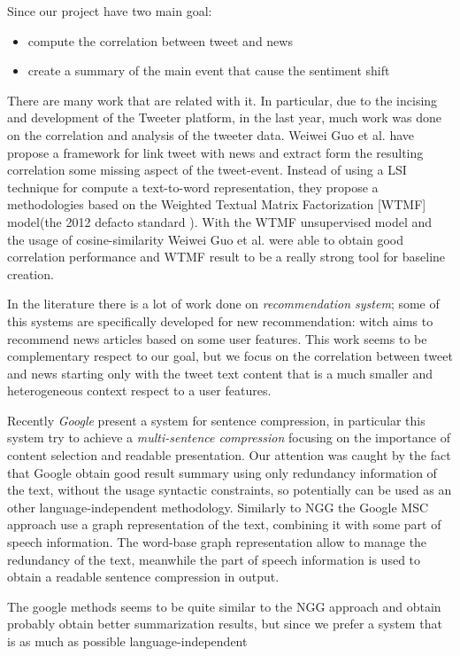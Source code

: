 Since our project have two main goal:
\begin{itemize}
	\item compute the correlation between tweet and news
	\item create a summary of the main event that cause the sentiment shift
\end{itemize}
There are many work that are related with it. 
In particular, due to the incising and development of the Tweeter platform, in the last year, much work was done on the correlation and analysis of the tweeter data. Weiwei Guo et al.\cite{LTN} have propose a framework for link tweet with news and extract form the resulting correlation some missing aspect of the tweet-event. Instead of using a LSI technique for compute a text-to-word representation, they propose a methodologies based on the Weighted Textual Matrix Factorization\cite{WTMF} [WTMF] model(the 2012 defacto standard ). With the WTMF unsupervised model and the usage of cosine-similarity Weiwei Guo et al. were able to obtain good correlation performance and WTMF result to be a really strong tool for baseline creation.

In the literature there is a lot of work done on \emph{recommendation system}; some of this systems are specifically developed for new recommendation: witch aims to recommend news articles based on some user features. This work seems to be complementary respect to our goal, but we focus on the correlation between tweet and news starting only with the tweet text content that is a much smaller and heterogeneous context respect to a user features. 

Recently \emph{Google} present a system for sentence compression, in particular this system try to achieve a \emph{multi-sentence compression}\cite{MSC} focusing on the importance of content selection and readable presentation.
Our attention was caught by the fact that Google obtain good result summary using only redundancy information of the text, without the usage syntactic constraints, so potentially can be used as an other language-independent methodology. Similarly to NGG the Google MSC approach use a graph representation of the text, combining it with some part of speech information. The word-base graph representation allow to manage the redundancy of the text, meanwhile the part of speech information is used to obtain a readable sentence compression in output. 

The google methods seems to be quite similar to the NGG approach and obtain probably obtain better summarization results, but since we prefer a system that is as much as possible language-independent 


